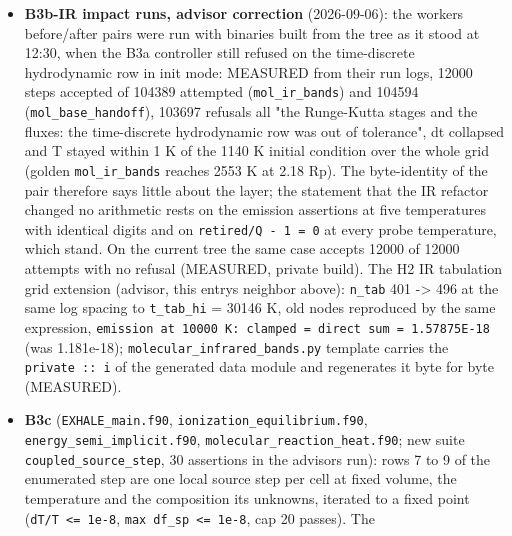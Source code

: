 \documentclass[english,a4paper]{my_memo}
\begin{document}
\begin{itemize}
  (1b) a failed energy update refuses the attempted step in both modes and
  the controller retakes it at half dt, exhaustion exits 2; (2a) the
  relaxation amnesty accepts a non-root only below a residual cap measured
  on the matrix, above it the cell keeps the composition it entered the
  sweep with (new acceptance class 6). Motivation: \texttt{oxygen\_chemistry} at its
  restated LW flux dies at step 0 on exactly this pair (LW-NORM-B
  verification entry above).
\item
  \textbf{B3b-IR impact runs, advisor correction} (2026-09-06): the worker\textquotesingle s
  before/after pairs were run with binaries built from the tree as it stood
  at 12:30, when the B3a controller still refused on the time-discrete
  hydrodynamic row in init mode: MEASURED from their run logs, 12000 steps
  accepted of 104389 attempted (\texttt{mol\_ir\_bands}) and 104594
  (\texttt{mol\_base\_handoff}), 103697 refusals all "the Runge-Kutta stages and the
  fluxes: the time-discrete hydrodynamic row was out of tolerance", dt
  collapsed and T stayed within 1 K of the 1140 K initial condition over the
  whole grid (golden \texttt{mol\_ir\_bands} reaches 2553 K at 2.18 Rp). The
  byte-identity of the pair therefore says little about the layer; the
  statement that the IR refactor changed no arithmetic rests on the emission
  assertions at five temperatures with identical digits and on
  \texttt{retired/Q\ -\ 1\ =\ 0} at every probe temperature, which stand. On the
  current tree the same case accepts 12000 of 12000 attempts with no
  refusal (MEASURED, private build). The H2 IR tabulation grid extension
  (advisor, this entry\textquotesingle s neighbor above): \texttt{n\_tab} 401 -\textgreater{} 496 at the same
  log spacing to \texttt{t\_tab\_hi} = 30146 K, old nodes reproduced by the same
  expression, \texttt{emission\ at\ 10000\ K:\ clamped\ =\ direct\ sum\ =\ 1.57875E-18}
  (was 1.181e-18); \texttt{molecular\_infrared\_bands.py} template carries the
  \texttt{private\ ::\ i} of the generated data module and regenerates it byte for
  byte (MEASURED).
\item
  \textbf{B3c} (\texttt{EXHALE\_main.f90}, \texttt{ionization\_equilibrium.f90},
  \texttt{energy\_semi\_implicit.f90}, \texttt{molecular\_reaction\_heat.f90}; new suite
  \texttt{coupled\_source\_step}, 30 assertions in the advisor\textquotesingle s run): rows 7 to 9 of
  the enumerated step are one local source step per cell at fixed volume,
  the temperature and the composition its unknowns, iterated to a fixed
  point (\texttt{\textbar{}dT\textbar{}/T\ \textless{}=\ 1e-8}, \texttt{max\ \textbar{}df\_sp\textbar{}\ \textless{}=\ 1e-8}, cap 20 passes). The

\end{itemize}
\end{document}
